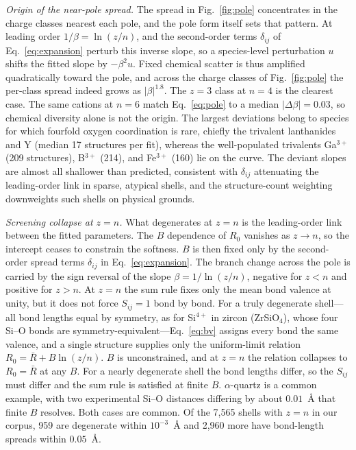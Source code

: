 \documentclass[aps,prmaterials,twocolumn,10pt,superscriptaddress,floatfix]{revtex4-2}
\newcommand{\runinsec}[1]{\medskip\emph{#1}}
\begin{document}
\runinsec{Origin of the near-pole spread.}  The spread in
Fig.~\ref{fig:pole} concentrates in the charge classes nearest each
pole, and the pole form itself sets that pattern.  At leading order
$1/\beta=\ln(z/n)$, and the second-order terms $\delta_{ij}$ of
Eq.~\eqref{eq:expansion} perturb this inverse slope, so a
species-level perturbation $u$ shifts the fitted slope by
$-\beta^{2}u$.  Fixed chemical scatter is thus amplified
quadratically toward the pole, and across the charge classes of
Fig.~\ref{fig:pole} the per-class spread indeed grows as
$|\beta|^{1.8}$.  The $z=3$ class at $n=4$ is the clearest case.
The same cations at $n=6$ match Eq.~\eqref{eq:pole} to a median
$|\Delta\beta|=0.03$, so chemical diversity alone is not the
origin.  The largest deviations belong to species for which
fourfold oxygen coordination is rare, chiefly the trivalent
lanthanides and Y (median 17 structures per fit), whereas the
well-populated trivalents Ga$^{3+}$ (209 structures), B$^{3+}$
(214), and Fe$^{3+}$ (160) lie on the curve.  The deviant slopes
are almost all shallower than predicted, consistent with
$\delta_{ij}$ attenuating the leading-order link in sparse,
atypical shells, and the structure-count weighting downweights
such shells on physical grounds.

\runinsec{Screening collapse at $z=n$.} What degenerates at $z=n$ is the
leading-order link between the fitted parameters.
The $B$ dependence of $R_0$ vanishes as
$z\to n$, so the intercept ceases to constrain the softness.  $B$ is
then fixed only by the second-order spread terms $\delta_{ij}$ in
Eq.~\eqref{eq:expansion}.  The branch change across the pole is
carried by the sign reversal of the slope $\beta=1/\ln(z/n)$, negative
for $z<n$ and positive for $z>n$. At $z=n$ the sum rule fixes only the
mean bond valence at unity, but it does not force $S_{ij}=1$ bond
by bond.  For a truly degenerate shell---all bond lengths equal by
symmetry, as for Si$^{4+}$ in zircon (ZrSiO$_4$), whose four Si--O
bonds are symmetry-equivalent---Eq.~\eqref{eq:bv}
assigns every bond the same valence, and a single structure supplies
only the uniform-limit relation $R_0=\bar R+B\ln(z/n)$.  $B$ is
unconstrained, and at $z=n$ the relation collapses to $R_0=\bar R$ at
any $B$.  For a nearly degenerate shell the bond lengths
differ, so the $S_{ij}$ must differ and the sum rule is
satisfied at finite $B$.  $\alpha$-quartz is a common
example, with two experimental Si--O distances differing by about
$0.01$~\AA{} that finite $B$ resolves.  Both cases are common.  Of
the 7,565 shells with $z=n$ in our corpus, 959 are
degenerate within $10^{-3}$~\AA{} and 2,960 more have bond-length
spreads within $0.05$~\AA{}.
\end{document}
